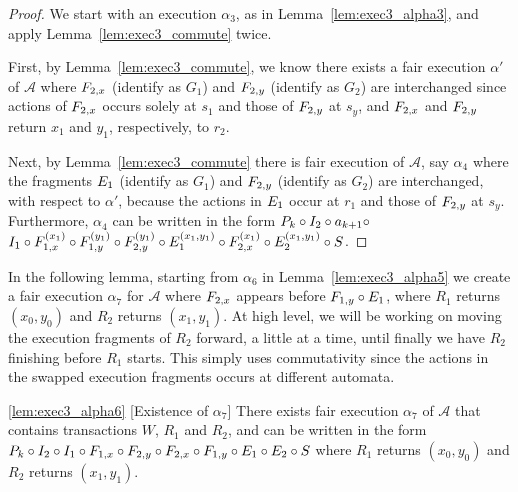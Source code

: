 \begin{proof}
We start with an execution  $\alpha_3$, as in  Lemma~\ref{lem:exec3_alpha3}, and apply Lemma~\ref{lem:exec3_commute} twice.  

First, by  Lemma~\ref{lem:exec3_commute}, we know there exists a fair execution $\alpha'$ of $\mathcal{A}$
where  $\fragt{F_{2,x}}{\alpha_3}{}$ (identify as $G_1$) and 
$\fragt{F_{2,y}}{\alpha_3}{}$ (identify as $G_2$)  are interchanged since actions of 
$\fragt{F_{2,x}}{\alpha_3}{}$ occurs solely at $s_1$ and those of $\fragt{F_{2,y}}{\alpha_3}{}$ at $s_y$, 
and  $\fragt{F_{2,x}}{\alpha_3}{}$ and $\fragt{F_{2,y}}{\alpha_3}{}$ return $x_1$ and $y_1$, respectively, to $r_2$.


Next, by Lemma~\ref{lem:exec3_commute} there is 
fair execution  of $\mathcal{A}$,  say $\alpha_4$ where
the fragments 
$\fragt{E_1}{\alpha_3}{}$ (identify as $G_1$)  and 
$\fragt{F_{2,y}}{\alpha_3}{}$ (identify as $G_2$) are interchanged, with respect to $\alpha'$, because  the actions in  $\fragt{E_1}{\alpha'}{}$ occur at $r_1$ and 
those of $\fragt{F_{2,y}}{\alpha_3}{}$ at $s_y$. Furthermore, $\alpha_4$
  can be written in the form
 $  \finiteprefixA{k-1}{k}  \circ  \fragt{I_2}{\alpha''}{} \circ  a_{k+1}  \circ $$
  \fragt{I_1}{\alpha''}{} \circ \fragt{F_{1,x}}{\alpha''}{x_1}
   \circ \fragt{F_{1,y}}{\alpha''}{y_1} 
  \circ \fragt{F_{2,y}}{\alpha''}{y_1} 
\circ \fragt{E_1}{\alpha''}{x_1, y_1}
\circ \fragt{F_{2,x}}{\alpha''}{x_1} \circ \fragt{E_2}{\alpha''}{x_1, y_1}
\circ \fragt{S}{\alpha''}{}$.
\end{proof}


In the following lemma,  starting from $\alpha_6$ in Lemma~\ref{lem:exec3_alpha5} we create a fair execution $\alpha_7$ for $\mathcal{A}$ where $\fragt{F_{2,x}}{\alpha_7}{}$ 
appears  before $\fragn{F_{1,y}}{\alpha_7}{y_0} \circ\fragn{E_1}{\alpha_7}{x_0, y_0}$, where $R_1$ returns $(x_0, y_0)$ and $R_2$ returns $(x_1, y_1)$.
At high level, we will be working on moving the execution fragments  of $R_2$ forward, a little at a time, until finally we have $R_2$ finishing before $R_1$ starts.  This simply uses commutativity since the actions in the swapped execution fragments occurs at different automata.

\begin{lemma*}\ref{lem:exec3_alpha6} [Existence of $\alpha_7$] 
\sloppy There exists  fair execution $\alpha_7$  of $\mathcal{A}$ that contains transactions $W$, $R_1$ and $R_2$, and   can be written in the form
$\finiteprefixA{k-1}{k} \circ \fragt{I_2}{\alpha_7}{}  \circ \fragt{I_1}{\alpha_7}{} \circ \fragn{F_{1,x}}{\alpha_7}{x_0} 
\circ \fragn{F_{2,y}}{\alpha_7}{y_1}\circ \fragn{F_{2,x}}{\alpha_7}{x_1} 
 \circ \fragn{F_{1,y}}{\alpha_7}{y_0} \circ\fragn{E_1}{\alpha_7}{x_0, y_0}\circ
 \fragn{E_2}{\alpha_7}{x_1, y_1}\circ \fragt{S}{\alpha_7}{}$ where $R_1$ returns $(x_0, y_0)$ and $R_2$ returns $(x_1, y_1)$.
\end{lemma*}

